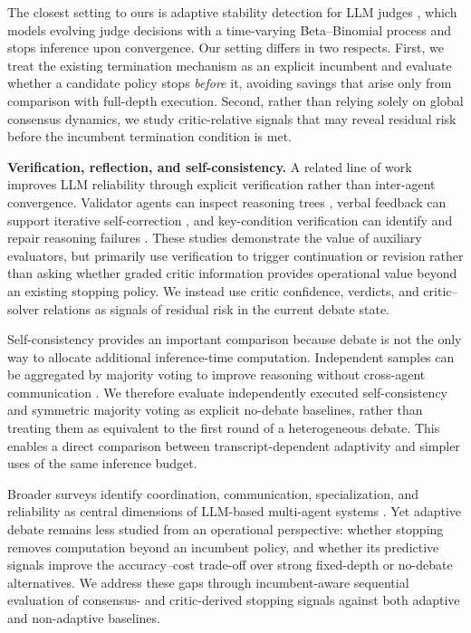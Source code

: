 \documentclass{llncs}
\begin{document}
The closest setting to ours is adaptive stability detection for LLM judges \cite{ref_9}, which models evolving judge decisions with a time-varying Beta--Binomial process and stops inference upon convergence. Our setting differs in two respects. First, we treat the existing termination mechanism as an explicit incumbent and evaluate whether a candidate policy stops \emph{before} it, avoiding savings that arise only from comparison with full-depth execution. Second, rather than relying solely on global consensus dynamics, we study critic-relative signals that may reveal residual risk before the incumbent termination condition is met.

\textbf{Verification, reflection, and self-consistency.}
A related line of work improves LLM reliability through explicit verification rather than inter-agent convergence. Validator agents can inspect reasoning trees \cite{ref_11}, verbal feedback can support iterative self-correction \cite{ref_12}, and key-condition verification can identify and repair reasoning failures \cite{ref_13}. These studies demonstrate the value of auxiliary evaluators, but primarily use verification to trigger continuation or revision rather than asking whether graded critic information provides operational value beyond an existing stopping policy. We instead use critic confidence, verdicts, and critic--solver relations as signals of residual risk in the current debate state.

Self-consistency provides an important comparison because debate is not the only way to allocate additional inference-time computation. Independent samples can be aggregated by majority voting to improve reasoning without cross-agent communication \cite{ref_10}. We therefore evaluate independently executed self-consistency and symmetric majority voting as explicit no-debate baselines, rather than treating them as equivalent to the first round of a heterogeneous debate. This enables a direct comparison between transcript-dependent adaptivity and simpler uses of the same inference budget.

Broader surveys identify coordination, communication, specialization, and reliability as central dimensions of LLM-based multi-agent systems \cite{ref_7,ref_8,ref_14,ref_15}. Yet adaptive debate remains less studied from an operational perspective: whether stopping removes computation beyond an incumbent policy, and whether its predictive signals improve the accuracy--cost trade-off over strong fixed-depth or no-debate alternatives. We address these gaps through incumbent-aware sequential evaluation of consensus- and critic-derived stopping signals against both adaptive and non-adaptive baselines.
\end{document}
